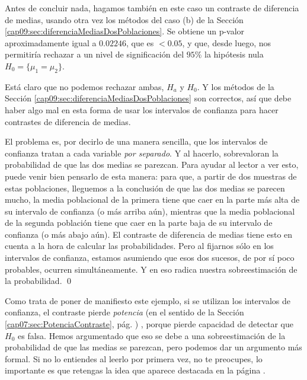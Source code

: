 \begin{ejemplo}
Antes de concluir nada, hagamos también en este caso un contraste de diferencia de medias, usando otra vez  los métodos del caso (b) de la Sección \ref{cap09:sec:diferenciaMediasDosPoblaciones}. Se obtiene un p-valor aproximadamente igual a $0.02246$, que es $<0.05$, y que, desde luego, nos permitiría rechazar a un nivel de significación del $95\%$ la hipótesis nula $H_0=\{\mu_1=\mu_2\}$.

Está claro que no podemos rechazar ambas, $H_a$ y $H_0$. Y los métodos de la Sección \ref{cap09:sec:diferenciaMediasDosPoblaciones} son correctos, así que debe haber algo mal en esta forma de usar los intervalos de confianza para hacer contrastes de diferencia de medias.

El problema es, por decirlo de una manera sencilla, que los intervalos de confianza tratan a cada variable {\em por separado}. Y al hacerlo, sobrevaloran la probabilidad de que las dos medias se parezcan. Para ayudar al lector a ver esto, puede venir bien pensarlo de esta manera: para que, a partir de dos muestras de estas poblaciones, lleguemos a la conclusión de que las dos medias se parecen mucho, la media poblacional de la primera tiene que caer en la parte más alta de su intervalo de confianza (o más arriba aún), mientras que la media poblacional de la segunda población tiene que caer  en la parte baja de su intervalo de confianza (o más abajo aún). El contraste de diferencia de medias tiene esto en cuenta a la hora de calcular las probabilidades. Pero al fijarnos sólo en los intervalos de confianza, estamos asumiendo que esos dos sucesos, de por sí poco probables, ocurren simultáneamente. Y en eso radica nuestra sobreestimación de la probabilidad.
\qed
\end{ejemplo}

Como trata de poner de manifiesto este ejemplo, si se utilizan los intervalos de confianza, el contraste pierde {\em potencia} (en el sentido de la Sección \ref{cap07:sec:PotenciaContraste}, pág. \pageref{cap07:sec:PotenciaContraste}) , porque pierde capacidad de detectar que $H_0$ es falsa. Hemos argumentado que eso se debe a una sobreestimación de la probabilidad de que las medias se parezcan, pero podemos dar un argumento más formal. Si no lo entiendes al leerlo por primera vez, no te preocupes, lo importante es que retengas la idea que aparece destacada en la página \pageref{cap09:lugar:IntervalosVsContrastes}.

